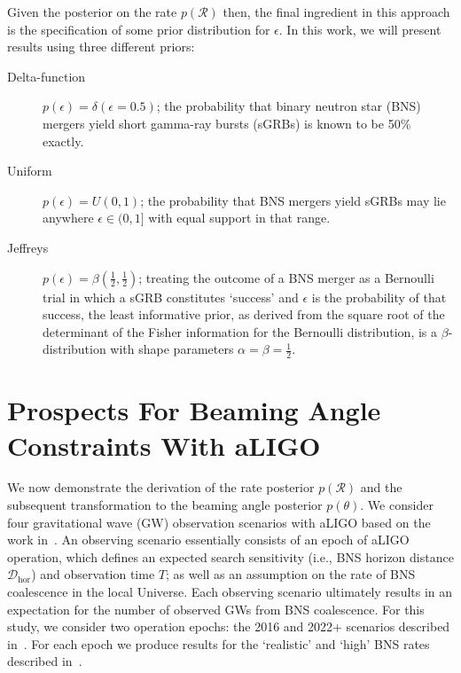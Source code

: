 \documentclass[twocolumn,nofootinbib]{revtex4-1}
\newcommand{\cbcrate}{{{\mathcal R}}}
\newcommand{\dhor}{{\mathcal D}_{\mathrm{hor}}}
\def\bns#1{binary neutron star#1 (BNS#1)\gdef\bns{BNS}}
\def\gw#1{gravitational wave#1 (GW#1)\gdef\gw{GW}}
\def\sgrb#1{short gamma-ray burst#1 (sGRB#1)\gdef\sgrb{sGRB}}
\begin{document}
Given the posterior on the rate $p(\cbcrate)$ then, the final ingredient in this
approach is the specification of some prior distribution for $\epsilon$.  In
this work, we will present results using three different priors:
%
\begin{description}
\item [Delta-function] $p(\epsilon) = \delta(\epsilon=0.5)$;
        the probability that \bns{} mergers yield \sgrb{s} is known to be 50\%
        exactly.

\item [Uniform] $p(\epsilon)=U(0,1)$;
        the probability that \bns{} mergers yield \sgrb{s} may lie anywhere
    $\epsilon \in (0,1]$ with equal support in that range. 

    \item [Jeffreys] $p(\epsilon)=\beta(\frac{1}{2},\frac{1}{2})$; treating the
        outcome of a \bns{} merger as a Bernoulli trial in which a \sgrb{}
        constitutes `success' and $\epsilon$ is the probability of that success,
        the least informative prior, as derived from the square root of the
        determinant of the Fisher information for the Bernoulli distribution, is
        a $\beta$-distribution with shape parameters $\alpha=\beta=\frac{1}{2}$.
\end{description}


\section{Prospects For Beaming Angle Constraints With aLIGO}
We now demonstrate the derivation of the rate posterior $p(\cbcrate)$ and the
subsequent transformation to the beaming angle posterior $p(\theta)$.  We
consider four \gw{} observation scenarios with aLIGO based on the work
in~\cite{ade_prospects}.  An observing scenario essentially consists of an epoch
of aLIGO operation, which defines an expected search sensitivity (i.e., \bns{}
horizon distance $\dhor$) and observation time $T$; as well as an assumption on
the rate of \bns{} coalescence in the local Universe.  Each observing scenario
ultimately results in an expectation for the number of observed \gw{s} from
\bns{} coalescence. For this study, we
consider two operation epochs: the 2016 and 2022+ scenarios described
in~\cite{ade_prospects}. For each epoch we produce results for the `realistic'
and `high' \bns{} rates described in~\cite{rates_paper}.
\end{document}
